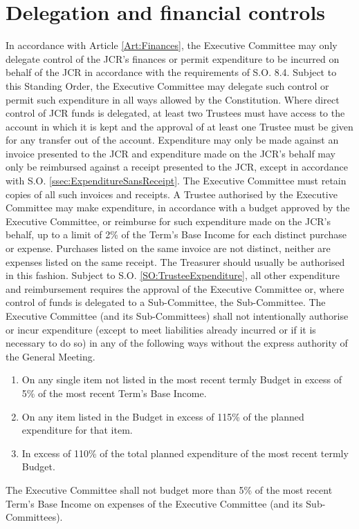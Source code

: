 \section{Delegation and financial controls} \label{sec:FinancialDelegation}
\npara In accordance with Article \ref{Art:Finances}, the Executive Committee may only delegate control of the JCR's finances or permit expenditure to be incurred on behalf of the JCR in accordance with the requirements of S.O. 8.4.  Subject to this Standing Order, the Executive Committee may delegate such control or permit such expenditure in all ways allowed by the Constitution.
\npara Where direct control of JCR funds is delegated, at least two Trustees must have access to the account in which it is kept and the approval of at least one Trustee must be given for any transfer out of the account.
\npara Expenditure may only be made against an invoice presented to the JCR and expenditure made on the JCR's behalf may only be reimbursed against a receipt presented to the JCR, except in accordance with S.O. \ref{ssec:ExpenditureSansReceipt}.  The Executive Committee must retain copies of all such invoices and receipts.
\npara \label{SO:TrusteeExpenditure} A Trustee authorised by the Executive Committee may make expenditure, in accordance with a budget approved by the Executive Committee, or reimburse for such expenditure made on the JCR's behalf, up to a limit of 2\% of the Term's Base Income for each distinct purchase or expense.  Purchases listed on the same invoice are not distinct, neither are expenses listed on the same receipt.  The Treasurer should usually be authorised in this fashion.
\npara Subject to S.O. \ref{SO:TrusteeExpenditure}, all other expenditure and reimbursement requires the approval of the Executive Committee or, where control of funds is delegated to a Sub-Committee, the Sub-Committee.
\npara The Executive Committee (and its Sub-Committees) shall not intentionally authorise or incur expenditure (except to meet liabilities already incurred or if it is necessary to do so) in any of the following ways without the express authority of the General Meeting.
\begin{enumerate}
\item On any single item not listed in the most recent termly Budget in excess of 5\% of the most recent Term's Base Income.
\item On any item listed in the Budget in excess of 115\% of the planned expenditure for that item.
\item In excess of 110\% of the total planned expenditure of the most recent termly Budget.
\end{enumerate}
\npara The Executive Committee shall not budget more than 5\% of the most recent Term's Base Income on expenses of the Executive Committee (and its Sub-Committees).
